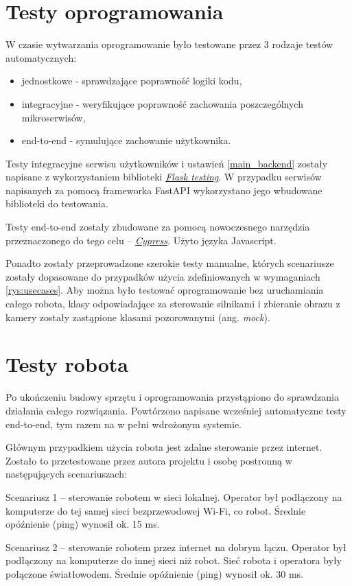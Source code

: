 \section{Testy oprogramowania}
W czasie wytwarzania oprogramowanie było testowane przez 3 rodzaje testów automatycznych:
\begin{itemize}
    \item jednostkowe - sprawdzające poprawność logiki kodu,
    \item integracyjne - weryfikujące poprawność zachowania poszczególnych mikroserwisów,
    \item end-to-end - symulujące zachowanie użytkownika.
\end{itemize}

Testy integracyjne serwisu użytkowników i ustawień \ref{main_backend} zostały napisane z wykorzystaniem biblioteki \href{https://pypi.org/project/Flask-Testing/}{\textit{Flask testing}}.
W przypadku serwisów napisanych za pomocą frameworka FastAPI wykorzystano jego wbudowane biblioteki do testowania.

Testy end-to-end zostały zbudowane za pomocą nowoczesnego narzędzia przeznaczonego do tego celu -- \href{https://www.cypress.io/}\textit{Cypress}.
Użyto języka Javascript.

Ponadto zostały przeprowadzone szerokie testy manualne, których scenariusze zostały dopasowane do przypadków użycia zdefiniowanych w wymaganiach \ref{rys:usecases}.
Aby można było testować oprogramowanie bez uruchamiania całego robota, klasy odpowiadające za sterowanie silnikami i zbieranie obrazu z kamery zostały zastąpione klasami pozorowanymi (ang. \textit{mock}).

\section{Testy robota}
Po ukończeniu budowy sprzętu i oprogramowania przystąpiono do sprawdzania działania całego rozwiązania.
Powtórzono napisane wcześniej automatyczne testy end-to-end, tym razem na w pełni wdrożonym systemie.

Głównym przypadkiem użycia robota jest zdalne sterowanie przez internet.
Zostało to przetestowane przez autora projektu i osobę postronną w następujących scenariuszach:

Scenariusz 1 -- sterowanie robotem w sieci lokalnej.
Operator był podłączony na komputerze do tej samej sieci bezprzewodowej Wi-Fi, co robot.
Średnie opóźnienie (ping) wynosił ok. 15 ms.

Scenariusz 2 -- sterowanie robotem przez internet na dobrym łączu.
Operator był podłączony na komputerze do innej sieci niż robot.
Sieć robota i operatora były połączone światłowodem.
Średnie opóźnienie (ping) wynosił ok. 30 ms.

